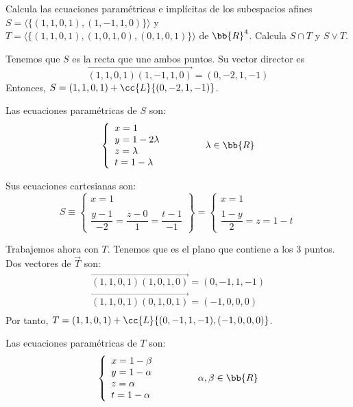 \begin{ejercicio}
    Calcula las ecuaciones paramétricas e implícitas de los subespacios afines $S = \langle\{(1, 1, 0, 1), (1, -1, 1, 0)\}\rangle$ y $T = \langle\{(1, 1, 0, 1), (1, 0, 1, 0), (0, 1, 0, 1)\}\rangle$ de $\bb{R}^4$. Calcula $S \cap T$ y $S \vee T$.

    Tenemos que $S$ es la recta que une ambos puntos. Su vector director es $$\vec{(1, 1, 0,1)(1,-1,1,0)} = (0, -2, 1, -1)$$
    Entonces, $S=(1,1,0,1) + \cc{L}\{(0,-2,1,-1)\}$.

    Las ecuaciones paramétricas de $S$ son:
    \begin{equation*}
        \left\{
            \begin{array}{l}
                x = 1 \\
                y = 1-2\lambda \\
                z = \lambda \\
                t = 1-\lambda
            \end{array}
        \right. \qquad \qquad \lambda\in \bb{R}
    \end{equation*}

    Sus ecuaciones cartesianas son:
    \begin{equation*}
        S\equiv \left\{
            \begin{array}{l}
                x = 1 \\ \\
                \dfrac{y-1}{-2} = \dfrac{z-0}{1} = \dfrac{t-1}{-1}
            \end{array}
        \right\} = \left\{
            \begin{array}{l}
                x = 1 \\ \\
                \dfrac{1-y}{2} = z = 1-t
            \end{array}
        \right.
    \end{equation*}

    Trabajemos ahora con $T$. Tenemos que es el plano que contiene a los 3 puntos. Dos vectores de $\vec{T}$ son:
    \begin{gather*}
        \vec{(1,1,0,1)(1,0,1,0)} = (0,-1,1,-1)\\
        \vec{(1,1,0,1)(0,1,0,1)} = (-1,0,0,0)\\
    \end{gather*}
    Por tanto, $T=(1,1,0,1) + \cc{L}\{(0,-1,1,-1),(-1,0,0,0)\}$.

    Las ecuaciones paramétricas de $T$ son:
    \begin{equation*}
        \left\{
            \begin{array}{l}
                x = 1 -\beta \\
                y = 1-\alpha\\
                z = \alpha \\
                t = 1-\alpha
            \end{array}
        \right. \qquad \qquad \alpha,\beta\in \bb{R}
    \end{equation*}


\end{ejercicio}
